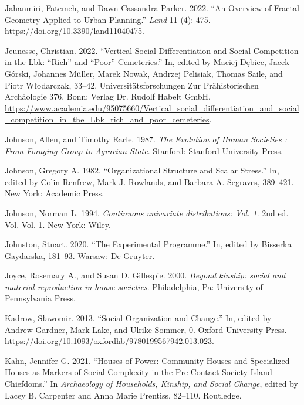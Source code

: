 \documentclass[
  12pt,
  a4paper, twoside]{book}
\newlength{\cslhangindent}
\newlength{\cslentryspacingunit} %
\newenvironment{CSLReferences}[2] %
 {%
  \setlength{\parindent}{0pt}
  \ifodd #1
  \let\oldpar\par
  \def\par{\hangindent=\cslhangindent\oldpar}
  \fi
  \setlength{\parskip}{#2\cslentryspacingunit}
 }%
 {}
\begin{document}
\begin{CSLReferences}{1}{0}
\leavevmode{}%
Jahanmiri, Fatemeh, and Dawn Cassandra Parker. 2022. {``An Overview of Fractal Geometry Applied to Urban Planning.''} \emph{Land} 11 (4): 475. \url{https://doi.org/10.3390/land11040475}.

\leavevmode{}%
Jeunesse, Christian. 2022. {``Vertical Social Differentiation and Social Competition in the Lbk: {``}Rich{''} and {``}Poor{''} Cemeteries.''} In, edited by Maciej Dębiec, Jacek Górski, Johannes Müller, Marek Nowak, Andrzej Pelisiak, Thomas Saile, and Piotr Włodarczak, 33--42. Universitätsforschungen Zur Prähistorischen Archäologie 376. Bonn: Verlag Dr. Rudolf Habelt GmbH. \url{https://www.academia.edu/95075660/Vertical_social_differentiation_and_social_competition_in_the_Lbk_rich_and_poor_cemeteries}.

\leavevmode{}%
Johnson, Allen, and Timothy Earle. 1987. \emph{The Evolution of Human Societies : From Foraging Group to Agrarian State}. Stanford: Stanford University Press.

\leavevmode{}%
Johnson, Gregory A. 1982. {``Organizational Structure and Scalar Stress.''} In, edited by Colin Renfrew, Mark J. Rowlands, and Barbara A. Segraves, 389--421. New York: Academic Press.

\leavevmode{}%
Johnson, Norman L. 1994. \emph{Continuous univariate distributions: Vol. 1}. 2nd ed. Vol. Vol. 1. New York: Wiley.

\leavevmode{}%
Johnston, Stuart. 2020. {``The Experimental Programme.''} In, edited by Bisserka Gaydarska, 181--93. Warsaw: De Gruyter.

\leavevmode{}%
Joyce, Rosemary A., and Susan D. Gillespie. 2000. \emph{Beyond kinship: social and material reproduction in house societies}. Philadelphia, Pa: University of Pennsylvania Press.

\leavevmode{}%
Kadrow, Sławomir. 2013. {``Social Organization and Change.''} In, edited by Andrew Gardner, Mark Lake, and Ulrike Sommer, 0. Oxford University Press. \url{https://doi.org/10.1093/oxfordhb/9780199567942.013.023}.

\leavevmode{}%
Kahn, Jennifer G. 2021. {``Houses of Power: {Community} Houses and Specialized Houses as Markers of Social Complexity in the Pre-Contact {Society Island} Chiefdoms.''} In \emph{Archaeology of {Households}, {Kinship}, and {Social Change}}, edited by Lacey B. Carpenter and Anna Marie Prentiss, 82--110. {Routledge}.


\end{CSLReferences}
\end{document}
